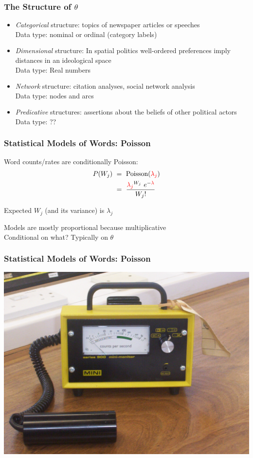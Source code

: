 \documentclass[11pt,compress,professionalfonts]{beamer}
\newcommand{\ita}{\begin{itemize}}
\newcommand{\itm}{\item[]}
\newcommand{\itz}{\end{itemize}}
\begin{document}
\begin{frame}[t]\frametitle{The Structure of $\theta$}

\ita
\itm \textsl{Categorical} structure: topics of newspaper articles or speeches\\Data type: nominal or ordinal (category labels)
\itm \textsl{Dimensional} structure: In spatial politics well-ordered preferences imply distances in an ideological space\\Data type: Real numbers
\itm \textsl{Network} structure: citation analyses, social network analysis\\Data type: nodes and arcs
\itm \textsl{Predicative} structures: assertions about the beliefs of other political actors\\Data type: ??
\itz

\end{frame}
\begin{frame}[t]\frametitle{Statistical Models of Words: Poisson}

Word counts/rates are conditionally Poisson:
\begin{align*}
P(W_j) &~=~ \text{Poisson}(\textcolor{red}{\lambda_{j}})\\
&~=~ \frac{\textcolor{red}{\lambda_{j}}^{W_{j}}~e^{-\textcolor{red}{\lambda}}}{W_{j}!}
\end{align*}

Expected $W_{j}$ (and its variance) is $\lambda_{j}$

Models are mostly proportional because multiplicative
~\\
Conditional on what?  Typically on $\theta$

\end{frame}
\begin{frame}[t]\frametitle{Statistical Models of Words: Poisson}

\centerline{\includegraphics[scale=.2]{pictures/geiger_counter}}

\end{frame}
\end{document}
